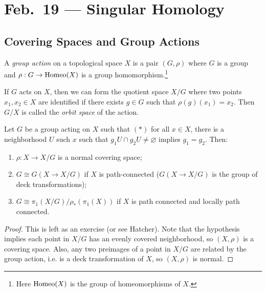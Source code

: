 \chapter{Feb.~19 --- Singular Homology}

\section{Covering Spaces and Group Actions}

\begin{definition}
  A \emph{group action} on a topological space $X$ is
  a pair $(G, \rho)$ where $G$ is a group and
  $\rho : G \to \operatorname{Homeo}(X)$ is a group homomorphism.\footnote{Here $\operatorname{Homeo}(X)$ is the group of homeomorphisms of $X$.}
\end{definition}

\begin{remark}
  If $G$ acts on $X$, then we can form the quotient
  space $X / G$ where two points $x_1, x_2 \in X$ are
  identified if there exists $g \in G$ such that
  $\rho(g)(x_1) = x_2$. Then $G / X$ is called the
  \emph{orbit space} of the action.
\end{remark}

\begin{theorem}
  Let $G$ be a group acting on $X$ such that $(*)$
  for all $x \in X$, there is a neighborhood
  $U$ such $x$ such that $g_1 U \cap g_2 U \ne \varnothing$
  implies $g_1 = g_2$. Then:
  \begin{enumerate}
    \item $\rho : X \to X / G$ is a normal covering
      space;
    \item $G \cong G(X \to X / G)$ if $X$ is
      path-connected ($G(X \to X / G)$ is
      the group of deck transformations);
    \item $G \cong \pi_1(X / G) / \rho_*(\pi_1(X))$
      if $X$ is path connected and locally path
      connected.
  \end{enumerate}
\end{theorem}

\begin{proof}
  This is left as an exercise (or see Hatcher). Note
  that the hypothesis implies each point in
  $X / G$ has an evenly covered neighborhood, so
  $(X, \rho)$ is a covering space. Also, any two
  preimages of a point in $X / G$ are related by the
  group action, i.e. is a deck transformation
  of $X$, so $(X, \rho)$ is normal.
\end{proof}

